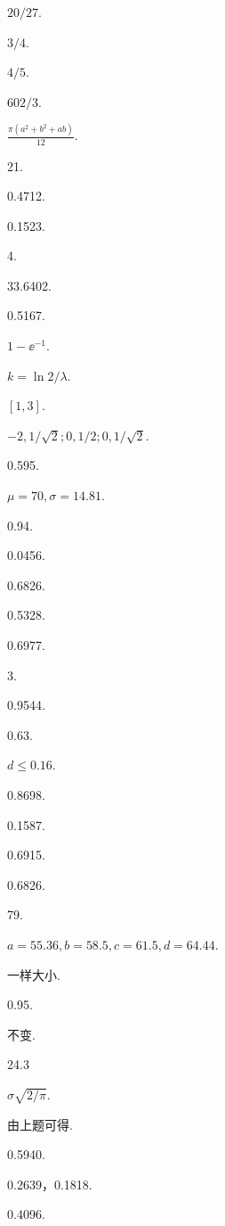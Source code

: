 \begin{answer}
  \item $20/27$.
  \item $3/4$.
  \item $4/5$.
  \item $602/3$.
  \item $\frac{\pi(a^2+b^2+ab)}{12}$.
  \item 21.
  \item 0.4712.
  \item 0.1523.
  \item 4.
  \item 33.6402.
  \item 0.5167.
  \item $1-\ee^{-1}$.
  \item $k=\ln2/\lambda$.
  \item $[1,3]$.
  \item $-2,1/\sqrt2;0,1/2;0,1/\sqrt2$.
  \item 0.595.
  \item \begin{enumerate*}
    \item $\mu=70,\sigma=14.81$.
    \item 0.94.
  \end{enumerate*}
  \item 0.0456.
  \item 0.6826.
  \item \begin{enumerate*}
    \item 0.5328.
    \item 0.6977.
    \item 3.
  \end{enumerate*}
  \item \begin{enumerate*}
    \item 0.9544.
    \item 0.63.
    \item $d\le0.16$.
  \end{enumerate*}
  \item 0.8698.
  \item \begin{enumerate*}
    \item 0.1587.
    \item 0.6915.
    \item 0.6826.
  \end{enumerate*}

  \item 79.
  \item $a=55.36,b=58.5,c=61.5,d=64.44$.
  \item 一样大小.
  \item 0.95.
  \item 不变.
  \item 24.3
  \item $\sigma\sqrt{2/\pi}$.
  \item 由上题可得.
  \item 0.5940.
  \item 0.2639，0.1818.
  \item 0.4096.
\end{answer}

